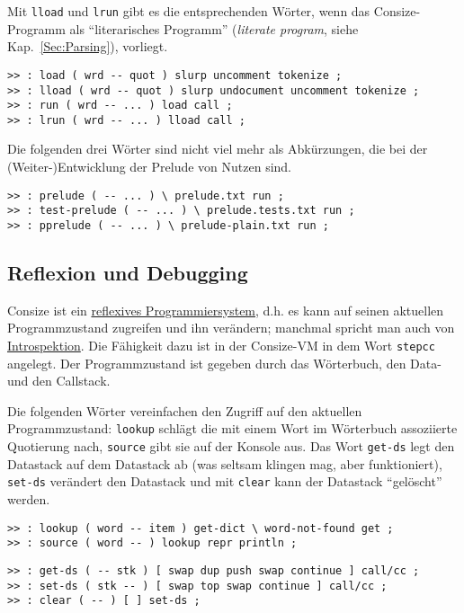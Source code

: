 Mit \verb|lload| und \verb|lrun| gibt es die entsprechenden Wörter, wenn das Consize-Programm als "`literarisches Programm"' (\emph{literate program}, siehe Kap.~\ref{Sec:Parsing}), vorliegt.

\begin{verbatim}
>> : load ( wrd -- quot ) slurp uncomment tokenize ;
>> : lload ( wrd -- quot ) slurp undocument uncomment tokenize ;
>> : run ( wrd -- ... ) load call ;
>> : lrun ( wrd -- ... ) lload call ;
\end{verbatim}

Die folgenden drei Wörter sind nicht viel mehr als Abkürzungen, die bei der (Weiter-)Entwicklung der Prelude von Nutzen sind.

\begin{verbatim}
>> : prelude ( -- ... ) \ prelude.txt run ;
>> : test-prelude ( -- ... ) \ prelude.tests.txt run ;
>> : pprelude ( -- ... ) \ prelude-plain.txt run ;
\end{verbatim}

\subsection{Reflexion und Debugging}

Consize ist ein \href{http://de.wikipedia.org/wiki/Reflexion\_(Programmierung)}{reflexives Programmiersystem}, d.h. es kann auf seinen aktuellen Programmzustand zugreifen und ihn verändern; manchmal spricht man auch von \href{http://de.wikipedia.org/wiki/Reflexion\_(Programmierung)}{Introspektion}. Die Fähigkeit dazu ist in der Consize-VM in dem Wort \verb|stepcc| angelegt. Der Programmzustand ist gegeben durch das Wörterbuch, den Data- und den Callstack.

Die folgenden Wörter vereinfachen den Zugriff auf den aktuellen Programmzustand: \verb|lookup| schlägt die mit einem Wort im Wörterbuch assoziierte Quotierung nach, \verb|source| gibt sie auf der Konsole aus. Das Wort \verb|get-ds| legt den Datastack auf dem Datastack ab (was seltsam klingen mag, aber funktioniert), \verb|set-ds| verändert den Datastack und mit \verb|clear| kann der Datastack "`gelöscht"' werden.

\begin{verbatim}
>> : lookup ( word -- item ) get-dict \ word-not-found get ;  
>> : source ( word -- ) lookup repr println ;
\end{verbatim}

\begin{verbatim}
>> : get-ds ( -- stk ) [ swap dup push swap continue ] call/cc ;
>> : set-ds ( stk -- ) [ swap top swap continue ] call/cc ;
>> : clear ( -- ) [ ] set-ds ;
\end{verbatim}

